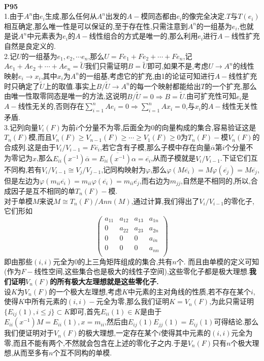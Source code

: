 \documentclass[b5paper,twoside]{ctexart}
\begin{document}
\pagestyle{plain}
\noindent\\
\textbf{P95}\\
1.由于$A^n$由$e_i$生成,那么任何从$A^n$出发的$A-$模同态都由$e_i$的像完全决定.$T$与$T(e_i)$相互确定,那么唯一性是可以保证的,至于存在性,只需注意到$A^n$的一组基为$e_i$,也就是说$A^n$中元素表为$e_i$的$A-$线性组合的方式是唯一的,那么利用$e_i$进行$A-$线性扩充自然是良定义的.\\
2.记$U$的一组基为$e_1,e_2,\cdots e_n$,那么$U=Fe_1+Fe_2+\cdots +Fe_n$,记$Ae_1+Ae_2+\cdots +Ae_n=\tilde{U}$我们只需证明$B=\tilde{U}$即可,如果不是,考虑$U\to A^n$的线性映射$e_i\to x_i$,其中$x_i$为$A^n$的一组基,考虑它的扩充,由1的论证可知进行$A-$线性扩充时只确定了$\tilde{U}$上的取值.事实上$B/\tilde{U}\to A^n$的每一个映射都能给出$T$的一个扩充,那么由唯一性取零同态是唯一的方法,这说明$B/\tilde{U}=0\Rightarrow B=\tilde{U}$.由可扩充性可知$e_i$是$A-$线性无关的,否则存在$\sum_{i=1}^nAe_i=0\Rightarrow \sum_{i=1}^nAx_i=0$,与$x_i$的$A-$线性无关性矛盾.\\
3.记列向量$V_i(F)$为前$i$个分量不为零,后面全为0的向量构成的集合,容易验证这是$T_n(F)$模,而且$V_n(F)\geq V_{n-1}(F)\geq \cdots \geq V_1(F)\geq 0$为$T_n(F)-$模$V_n(F)$的合成列.这是由于$V_{i}/V_{i-1}=F\overline{e_i}$,若它含有子模,那么子模中存在向量$\overline{\alpha}$第$i$个分量不为零记为$x$,那么$E_{ii}(x^{-1})\overline{\alpha}=\overline{E_{ii}(x^{-1})\alpha}=\overline{e_i}$,从而子模就是$V_i/V_{i-1}$.下证它们互不同构,若有$V_i/V_{i-1}\cong V_j/V_{j-1}$,记同构映射为$\varphi$,那么$\varphi(M\overline{e_i})=M\varphi(\overline{e_j})=M\overline{e_j}$,但是左边为$\varphi(m_{ii}\overline{e_i})=m_{ii}\varphi(\overline{e_i})=m_{ii}\overline{e_j}$,而右边为$m_{jj}$,自然是不相同的,所以,合成因子是互不相同的单$T_n(F)-$模.\\
对于单模$M$来说$M\cong T_n(F)/Ann(M)$,通过计算,我们得出了$V_i/V_{i-1}$的零化子,它们形如
\[\left( \begin{array}{cccc}
a_{11} & a_{12} & a_{13} & a_{1n}\\
0 & a_{22} & a_{23}& a_{2n}\\
0 & 0 & 0&  a_{in}\\
0 & 0 & 0  &　a_{nn}\\
\end{array}\right) \]
即由那些$(i,i)$元全为$0$的上三角矩阵组成的集合,共有$n$个.
而且由单模的定义可知(作为$F-$线性空间,这些集合也是极大的线性子空间),这些零化子都是极大理想.\textbf{我们证明$V_n(F)$的所有极大左理想就是这些零化子.}\\
设$K$为$V_n(F)$的一个极大左理想,考虑$K$中元素的主对角线的性质,若不存在某个$i$,使得$K$中所有元素的$(i,i)-$元全为零,那么我们证明$K=V_n(F)$,为此只需证明$\{E_{ij}(1),i\leq j\}\subset K$即可,首先$E_{ii}(1)\in K$是由于$E_{ii}(x^{-1})M=E_{ii}(1),x=m_{ii}$,然后由$E_{ij}(1)E_{jj}(1)=E_{ij}(1)$可得结论.那么我们便证明对于$V_n(F)$的极大理想,一定存在某个$i$使得其中元素的$(i,i)$元全为零,而且不能有两个,不然就会包含在上述的零化子之内.于是$V_n(F)$只有$n$个极大理想,从而至多有$n$个互不同构的单模.\\
\end{document}
